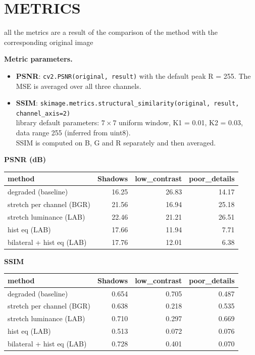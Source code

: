 \documentclass[11pt,a4paper]{article}
\begin{document}
\section{METRICS}
all the metrics are a result of the comparison of the method with the corresponding original image

\textbf{Metric parameters.}
\begin{itemize}
  \item \textbf{PSNR}: \texttt{cv2.PSNR(original, result)} with the default peak R = 255. The MSE is averaged over all three channels.
  \item \textbf{SSIM}: \texttt{skimage.metrics.structural\_similarity(original, result, channel\_axis=2)}\\
  library default parameters: $7\times7$ uniform window, K1 = 0.01, K2 = 0.03, data range 255 (inferred from uint8).\\
  SSIM is computed on B, G and R separately and then averaged.
\end{itemize}

\textbf{PSNR (dB)}

\begin{tabular}{@{}lrrr@{}}
\toprule
method & Shadows & low\_contrast & poor\_details \\
\midrule
degraded (baseline)       & 16.25 & 26.83 & 14.17 \\
stretch per channel (BGR) & 21.56 & 16.94 & 25.18 \\
stretch luminance (LAB)   & 22.46 & 21.21 & 26.51 \\
hist eq (LAB)             & 17.66 & 11.94 &  7.71 \\
bilateral + hist eq (LAB) & 17.76 & 12.01 &  6.38 \\
\bottomrule
\end{tabular}

\textbf{SSIM}

\begin{tabular}{@{}lrrr@{}}
\toprule
method & Shadows & low\_contrast & poor\_details \\
\midrule
degraded (baseline)       & 0.654 & 0.705 & 0.487 \\
stretch per channel (BGR) & 0.638 & 0.218 & 0.535 \\
stretch luminance (LAB)   & 0.710 & 0.297 & 0.669 \\
hist eq (LAB)             & 0.513 & 0.072 & 0.076 \\
bilateral + hist eq (LAB) & 0.728 & 0.401 & 0.070 \\
\bottomrule
\end{tabular}
\end{document}
